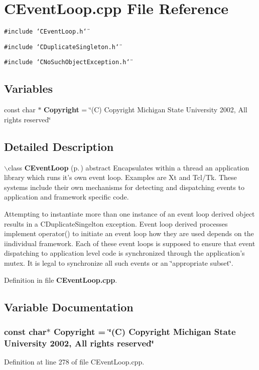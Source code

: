 \section{CEvent\-Loop.cpp File Reference}
\label{CEventLoop_8cpp}
{\tt \#include \char`\"{}CEvent\-Loop.h\char`\"{}}\par
{\tt \#include \char`\"{}CDuplicate\-Singleton.h\char`\"{}}\par
{\tt \#include \char`\"{}CNo\-Such\-Object\-Exception.h\char`\"{}}\par
\subsection*{Variables}
\begin{CompactItemize}
\item 
const char $\ast$ {\bf Copyright} = \char`\"{}(C) Copyright Michigan State University 2002, All rights reserved\char`\"{}
\end{CompactItemize}


\subsection{Detailed Description}


$\backslash$class {\bf CEvent\-Loop} {\rm (p.\,\pageref{classCEventLoop})} abstract  Encapsulates within a thread an application library which  runs it's own event loop. Examples are Xt and Tcl/Tk. These systems include their own mechanisms for detecting and dispatching events to application and framework specific code.

Attempting to instantiate more than one instance of an event  loop derived object results in a CDuplicate\-Singelton exception. Event loop derived processes implement operator() to  initiate an event loop how they are used depends on the iindividual framework. Each of these event loops is supposed to ensure that event dispatching to application level code is synchronized through the application's mutex. It is legal to synchronize all such events or an \char`\"{}appropriate subset\char`\"{}.



Definition in file {\bf CEvent\-Loop.cpp}.

\subsection{Variable Documentation}
\subsubsection{\setlength{\rightskip}{0pt plus 5cm}const char$\ast$ Copyright = \char`\"{}(C) Copyright Michigan State University 2002, All rights reserved\char`\"{}\hspace{0.3cm}{\tt  [static]}}\label{CEventLoop_8cpp_a0}




Definition at line 278 of file CEvent\-Loop.cpp.